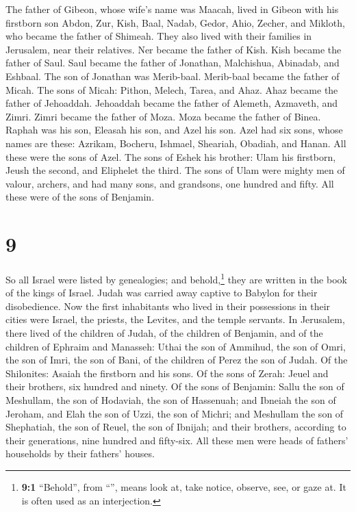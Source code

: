  The father of Gibeon, whose wife's name was Maacah,
lived in Gibeon  with his firstborn son Abdon, Zur, Kish,
Baal, Nadab,  Gedor, Ahio, Zecher,  and
Mikloth, who became the father of Shimeah. They also lived with their
families in Jerusalem, near their relatives.  Ner became
the father of Kish. Kish became the father of Saul. Saul became the
father of Jonathan, Malchishua, Abinadab, and Eshbaal. 
The son of Jonathan was Merib-baal. Merib-baal became the father of
Micah.  The sons of Micah: Pithon, Melech, Tarea, and
Ahaz.  Ahaz became the father of Jehoaddah. Jehoaddah
became the father of Alemeth, Azmaveth, and Zimri. Zimri became the
father of Moza.  Moza became the father of Binea. Raphah
was his son, Eleasah his son, and Azel his son.  Azel had
six sons, whose names are these: Azrikam, Bocheru, Ishmael, Sheariah,
Obadiah, and Hanan. All these were the sons of Azel.  The
sons of Eshek his brother: Ulam his firstborn, Jeush the second, and
Eliphelet the third.  The sons of Ulam were mighty men of
valour, archers, and had many sons, and grandsons, one hundred and
fifty. All these were of the sons of Benjamin.

\hypertarget{section-8}{%
\section{9}\label{section-8}}

 So all Israel were listed by genealogies; and
behold,\footnote{\textbf{9:1} ``Behold'', from ``'', means
  look at, take notice, observe, see, or gaze at. It is often used as an
  interjection.} they are written in the book of the kings of Israel.
Judah was carried away captive to Babylon for their disobedience.
 Now the first inhabitants who lived in their possessions
in their cities were Israel, the priests, the Levites, and the temple
servants.  In Jerusalem, there lived of the children of
Judah, of the children of Benjamin, and of the children of Ephraim and
Manasseh:  Uthai the son of Ammihud, the son of Omri, the
son of Imri, the son of Bani, of the children of Perez the son of Judah.
 Of the Shilonites: Asaiah the firstborn and his sons.
 Of the sons of Zerah: Jeuel and their brothers, six
hundred and ninety.  Of the sons of Benjamin: Sallu the
son of Meshullam, the son of Hodaviah, the son of Hassenuah;
 and Ibneiah the son of Jeroham, and Elah the son of Uzzi,
the son of Michri; and Meshullam the son of Shephatiah, the son of
Reuel, the son of Ibnijah;  and their brothers, according
to their generations, nine hundred and fifty-six. All these men were
heads of fathers' households by their fathers' houses.

